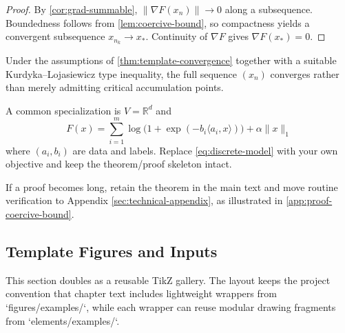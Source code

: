 \begin{proof}
By \cref{cor:grad-summable}, $\|\nabla F(x_n)\|\to 0$ along a subsequence. Boundedness follows from \cref{lem:coercive-bound}, so compactness yields a convergent subsequence $x_{n_k}\to x_\ast$. Continuity of $\nabla F$ gives $\nabla F(x_\ast)=0$.
\end{proof}

\begin{conjecture}
\label{conj:template-global-upgrade}
Under the assumptions of \cref{thm:template-convergence} together with a suitable Kurdyka--Lojasiewicz type inequality, the full sequence $(x_n)$ converges rather than merely admitting critical accumulation points.
\end{conjecture}

\begin{example}
\label{ex:discrete-model}
A common specialization is $V=\mathbb{R}^d$ and
\begin{equation}
\label{eq:discrete-model}
F(x)=\sum_{i=1}^{m}\log\bigl(1+\exp(-b_i\langle a_i,x\rangle)\bigr)+\alpha\|x\|_1
\end{equation}
where $(a_i,b_i)$ are data and labels. Replace \cref{eq:discrete-model} with your own objective and keep the theorem/proof skeleton intact.
\end{example}

\begin{remark}
\label{rem:appendix-ref}
If a proof becomes long, retain the theorem in the main text and move routine verification to Appendix \ref{sec:technical-appendix}, as illustrated in \cref{app:proof-coercive-bound}.
\end{remark}

\subsection{Template Figures and Inputs}
\label{ssec:template-figures}

This section doubles as a reusable TikZ gallery. The layout keeps the project convention that chapter text includes lightweight wrappers from `figures/examples/`, while each wrapper can reuse modular drawing fragments from `elements/examples/`.








